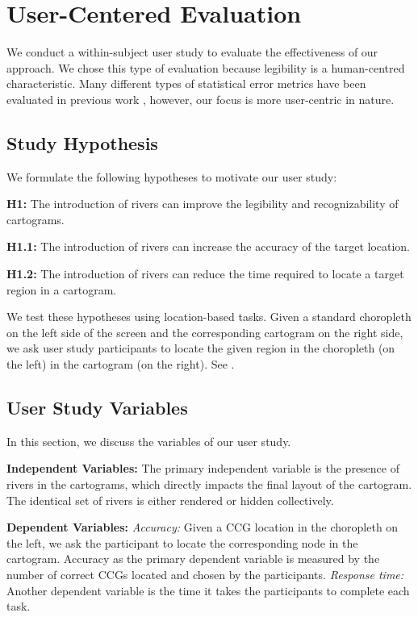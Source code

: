 \documentclass[Afour,sagev,times]{sagej}
\newcommand{\bobgraph}[1]{\noindent\textbf{#1}}
\begin{document}
\newcommand{\pCount}{24 }
\section{User-Centered Evaluation}\label{sec:{User-Centered Evaluation}}

We conduct a within-subject user study to evaluate the effectiveness of our approach.
We chose this type of evaluation because legibility is a human-centred characteristic.
Many different types of statistical error metrics have been evaluated in previous work \cite{nusrat2016State}, however, our focus is more user-centric in nature.

\subsection{Study Hypothesis}\label{subsec:{Study Hypothesis}}

We formulate the following hypotheses to motivate our user study:

\textbf{H1:} The introduction of rivers can improve the legibility and recognizability of cartograms.

\textbf{H1.1:} The introduction of rivers can increase the accuracy of the target location.

\textbf{H1.2:} The introduction of rivers can reduce the time required to locate a target region in a cartogram.

We test these hypotheses using location-based tasks.
Given a standard choropleth on the left side of the screen and the corresponding cartogram on the right side, we ask user study participants to locate the given region in the choropleth (on the left) in the cartogram (on the right).
See .

\subsection{User Study Variables}\label{subsec:{User Study Variables}}

In this section, we discuss the variables of our user study.

\bobgraph{Independent Variables: }The primary independent variable is the presence of rivers in the cartograms, which directly impacts the final layout of the cartogram. 
The identical set of rivers is either rendered or hidden collectively.

\bobgraph{Dependent Variables: }\textit{Accuracy:} Given a CCG location in the choropleth on the left, we ask the participant to locate the corresponding node in the cartogram.
Accuracy as the primary dependent variable is measured by the number of correct CCGs located and chosen by the participants.
\textit{Response time:} Another dependent variable is the time it takes the participants to complete each task.
\end{document}
